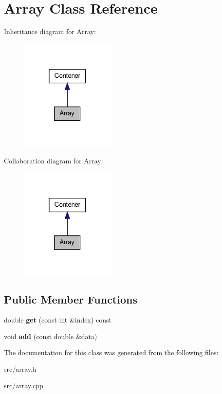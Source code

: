 \hypertarget{class_array}{\section{\-Array \-Class \-Reference}
\label{class_array}
}


\-Inheritance diagram for \-Array\-:
\nopagebreak
\begin{figure}[H]
\begin{center}
\leavevmode
\includegraphics[width=136pt]{class_array__inherit__graph}
\end{center}
\end{figure}


\-Collaboration diagram for \-Array\-:
\nopagebreak
\begin{figure}[H]
\begin{center}
\leavevmode
\includegraphics[width=136pt]{class_array__coll__graph}
\end{center}
\end{figure}
\subsection*{\-Public \-Member \-Functions}
\begin{DoxyCompactItemize}
\item 
\hypertarget{class_array_ac53de22eede2969b8c277674aac890dd}{double {\bfseries get} (const int \&index) const }\label{class_array_ac53de22eede2969b8c277674aac890dd}

\item 
\hypertarget{class_array_a1911ffe5822c9628a4a8035c93cf8c0d}{void {\bfseries add} (const double \&data)}\label{class_array_a1911ffe5822c9628a4a8035c93cf8c0d}

\end{DoxyCompactItemize}


\-The documentation for this class was generated from the following files\-:\begin{DoxyCompactItemize}
\item 
src/array.\-h\item 
src/array.\-cpp\end{DoxyCompactItemize}
